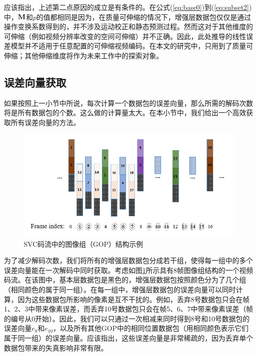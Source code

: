 应该指出，上述第二点原因的成立是有条件的。在公式(\ref{eq:base0})到(\ref{eq:subset2})中，${\rm\bf M}$和$p$的值都相同是因为，在质量可伸缩的情况下，增强层数据包仅仅是通过操作变换系数得到的，并不涉及运动校正和静态预测过程。然而这对于其他维度的可伸缩（例如视频分辨率改变的空间可伸缩）并不正确。因此，此处推导的线性误差模型并不适用于任意配置的可伸缩视频编码。在本文的研究中，只用到了质量可伸缩；其他伸缩维度将作为未来工作中的探索对象。

\subsection{误差向量获取}

如果按照上一小节中所说，每次计算一个数据包的误差向量，那么所需的解码次数将是所有数据包的个数。这么做的计算量太大。在本小节中，我们给出一个高效获取所有误差向量的方法。

\begin{figure}[h]
\centering
\includegraphics[width = 1.0\linewidth]{figures/GOP-structure.png}
\caption{SVC码流中的图像组（GOP）结构示例 \label{fig:GOP-structure}}
\end{figure}

为了减少解码次数，我们将所有的增强层数据包分成若干组，使得每一组中的多个误差向量能在一次解码中同时获取。考虑如图\ref{fig:GOP-structure}所示具有8帧图像组结构的一个视频码流。在该图中，基本层数据包是黑色的，增强层数据包按照颜色分为了几个组（相同颜色的属于同一组）。在每一组中，增强层数据包的误差向量可以同时计算，因为这些数据包所影响的像素是互不干扰的。例如，丢弃8号数据包只会在帧1、2、3中带来像素误差，而丢弃10号数据包只会在帧5、6、7中带来像素误差（帧的编号从0开始）。因此，我们可以只通过一次相减来同时得到8号和10号数据包的误差向量$e_{8}$和$e_{10}$，以及所有其他GOP中的相同位置数据包（用相同颜色表示它们属于同一组）的误差向量。应该指出，这些误差向量是非常稀疏的，因为丢弃单个数据包带来的失真影响非常有限。

